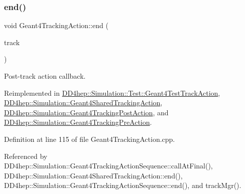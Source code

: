 \hypertarget{class_d_d4hep_1_1_simulation_1_1_geant4_tracking_action_a29f980c180576781771ea325b4a73f14}{}\label{class_d_d4hep_1_1_simulation_1_1_geant4_tracking_action_a29f980c180576781771ea325b4a73f14} 
\subsubsection{\texorpdfstring{end()}{end()}}
{\footnotesize\ttfamily void Geant4\+Tracking\+Action\+::end (\begin{DoxyParamCaption}\item[{const G4\+Track $\ast$}]{track }\end{DoxyParamCaption})\hspace{0.3cm}{\ttfamily [virtual]}}



Post-\/track action callback. 



Reimplemented in \hyperlink{class_d_d4hep_1_1_simulation_1_1_test_1_1_geant4_test_track_action_a41bc0c1912089342579388ae2c176c69}{D\+D4hep\+::\+Simulation\+::\+Test\+::\+Geant4\+Test\+Track\+Action}, \hyperlink{class_d_d4hep_1_1_simulation_1_1_geant4_shared_tracking_action_a35f435a97bbe15def248f21f37847a12}{D\+D4hep\+::\+Simulation\+::\+Geant4\+Shared\+Tracking\+Action}, \hyperlink{class_d_d4hep_1_1_simulation_1_1_geant4_tracking_post_action_ac64fbbb53136a1696ac45c060fdcde70}{D\+D4hep\+::\+Simulation\+::\+Geant4\+Tracking\+Post\+Action}, and \hyperlink{class_d_d4hep_1_1_simulation_1_1_geant4_tracking_pre_action_a372b3efd2f2ac8f2c75bb435fd286ac3}{D\+D4hep\+::\+Simulation\+::\+Geant4\+Tracking\+Pre\+Action}.



Definition at line 115 of file Geant4\+Tracking\+Action.\+cpp.



Referenced by D\+D4hep\+::\+Simulation\+::\+Geant4\+Tracking\+Action\+Sequence\+::call\+At\+Final(), D\+D4hep\+::\+Simulation\+::\+Geant4\+Shared\+Tracking\+Action\+::end(), D\+D4hep\+::\+Simulation\+::\+Geant4\+Tracking\+Action\+Sequence\+::end(), and track\+Mgr().

\hypertarget{class_d_d4hep_1_1_simulation_1_1_geant4_tracking_action_abbd91189fe749f8b8cf5224d365bbcb0}{}\label{class_d_d4hep_1_1_simulation_1_1_geant4_tracking_action_abbd91189fe749f8b8cf5224d365bbcb0} 
